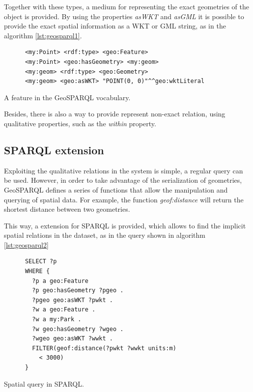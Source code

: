 Together with these types, a medium for representing the exact geometries of the object is provided. By using the properties \textit{asWKT} and \textit{asGML} it is possible to provide the exact spatial information as a WKT or GML\cite{gmlspec} string, as in the algorithm \ref{lst:geosparql1}.

\begin{listing}\centering
  \begin{minipage}{.6\textwidth}
    \begin{verbatim}
      <my:Point> <rdf:type> <geo:Feature> 
      <my:Point> <geo:hasGeometry> <my:geom>
      <my:geom> <rdf:type> <geo:Geometry>
      <my:geom> <geo:asWKT> "POINT(0, 0)"^^geo:wktLiteral
    \end{verbatim}
  \end{minipage}
  \caption{A feature in the GeoSPARQL vocabulary.}\label{lst:geosparql1}
\end{listing}

Besides, there is also a way to provide represent non-exact relation, using qualitative properties, such as the \textit{within} property.

\subsection*{SPARQL extension}

Exploiting the qualitative relations in the system is simple, a regular query can be used. However, in order to take advantage of the serialization of geometries, GeoSPARQL defines a series of functions that allow the manipulation and querying of spatial data. For example, the function \textit{geof:distance} will return the shortest distance between two geometries.

This way, a extension for SPARQL is provided, which allows to find the implicit spatial relations in the dataset, as in the query shown in algorithm \ref{lst:geosparql2}

\begin{listing}\centering
  \begin{minipage}{.6\textwidth}
    \begin{verbatim}
      SELECT ?p
      WHERE {
        ?p a geo:Feature
        ?p geo:hasGeometry ?pgeo .
        ?pgeo geo:asWKT ?pwkt .
        ?w a geo:Feature .
        ?w a my:Park .
        ?w geo:hasGeometry ?wgeo .
        ?wgeo geo:asWKT ?wwkt .
        FILTER(geof:distance(?pwkt ?wwkt units:m)
          < 3000)
      }
    \end{verbatim}
  \end{minipage}
  \caption{Spatial query in SPARQL.}\label{lst:geosparql2}
\end{listing}

